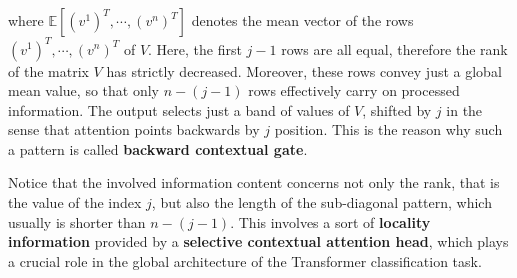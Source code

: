 \documentclass[11pt,a4paper,reqno]{amsart} %
\theoremstyle{definition}
\numberwithin{equation}{section}          %
\begin{document}
where $\mathbb{E}\left[(v^1)^T, \cdots, (v^n)^T\right]$ denotes the mean vector of the rows $(v^1)^T, \cdots, (v^n)^T$ of $V$. Here, the first $j-1$ rows are all equal, therefore the rank of the matrix $V$ has strictly decreased. Moreover, these rows convey just a global mean value, so that only $n-(j-1)$ rows effectively carry on processed information. The output selects just a band of values of $V$, shifted by $j$ in the sense that attention points backwards by $j$ position. This is the reason why such a pattern is called \textbf{backward contextual gate}. 

Notice that the involved information content concerns not only the rank, that is the value of the index $j$, but also the length of the sub-diagonal pattern, which usually is shorter than $n-(j-1)$. This involves a sort of \textbf{locality information} provided by a \textbf{selective contextual attention head}, which plays a crucial role in the global architecture of the Transformer classification task.
\end{document}

